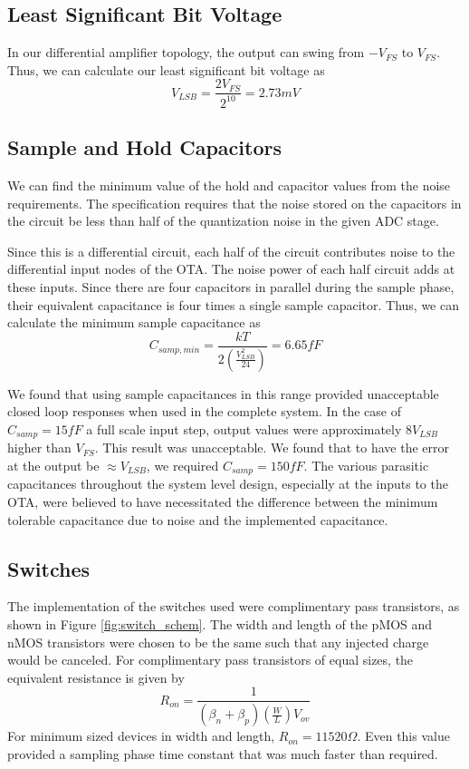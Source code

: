 \documentclass[journal]{IEEEtran}
\begin{document}
\subsection{Least Significant Bit Voltage}
In our differential amplifier topology, the output can swing from $-V_{FS}$ to $V_{FS}$. Thus, we can calculate our least significant bit voltage as
\begin{equation}
V_{LSB}=\frac{2V_{FS}}{2^{10}}=2.73mV
\end{equation}

\subsection{Sample and Hold Capacitors}
We can find the minimum value of the hold and capacitor values from the noise requirements. The specification requires that the noise stored on the capacitors in the circuit be less than half of the quantization noise in the given ADC stage. 

Since this is a differential circuit, each half of the circuit contributes noise to the differential input nodes of the OTA. The noise power of each half circuit adds at these inputs. Since there are four capacitors in parallel during the sample phase, their equivalent capacitance is four times a single sample capacitor. Thus, we can calculate the minimum sample capacitance as
\begin{equation}
C_{samp,min}=\frac{kT}{2\left(\frac{V_{LSB}^2}{24}\right)}=6.65fF
\end{equation}

We found that using sample capacitances in this range provided unacceptable closed loop responses when used in the complete system. In the case of $C_{samp}=15fF$ a full scale input step, output values were approximately $8V_{LSB}$ higher than $V_{FS}$. This result was unacceptable. We found that to have the error at the output be $\approx V_{LSB}$, we required $C_{samp}=150fF$. The various parasitic capacitances throughout the system level design, especially at the inputs to the OTA, were believed to have necessitated the difference between the minimum tolerable capacitance due to noise and the implemented capacitance.

\subsection{Switches}
The implementation of the switches used were complimentary pass transistors, as shown in Figure \ref{fig:switch_schem}. The width and length of the pMOS and nMOS transistors were chosen to be the same such that any injected charge would be canceled. For complimentary pass transistors of equal sizes, the equivalent resistance is given by
\begin{equation}
R_{on} = \frac{1}{\left(\beta_n+\beta_p\right)\left(\frac{W}{L}\right)V_{ov}}
\end{equation}
For minimum sized devices in width and length, $R_{on}=11520\Omega$. Even this value provided a sampling phase time constant that was much faster than required.
\end{document}
